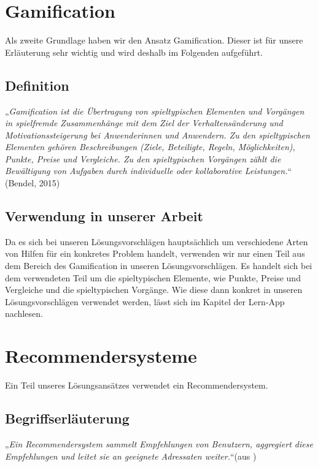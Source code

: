 \section{Gamification}
Als zweite Grundlage haben wir den Ansatz Gamification. Dieser ist für unsere Erläuterung sehr wichtig und wird deshalb im Folgenden aufgeführt.
\subsection{Definition}
„\textit{Gamification ist die Übertragung von spieltypischen Elementen und Vorgängen in spielfremde Zusammenhänge mit dem Ziel der Verhaltensänderung und Motivationssteigerung bei Anwenderinnen und Anwendern. Zu den spieltypischen Elementen gehören Beschreibungen (Ziele, Beteiligte, Regeln, Möglichkeiten), Punkte, Preise und Vergleiche. Zu den spieltypischen Vorgängen zählt die Bewältigung von Aufgaben durch individuelle oder kollaborative Leistungen.}“ (Bendel, 2015)

\subsection{Verwendung in unserer Arbeit}
Da es sich bei unseren Lösungsvorschlägen hauptsächlich um verschiedene Arten von Hilfen für ein konkretes Problem handelt, verwenden wir nur einen Teil aus dem Bereich des Gamification in unseren Lösungsvorschlägen. Es handelt sich bei dem verwendeten Teil um die spieltypischen Elemente, wie Punkte, Preise und Vergleiche und die spieltypischen Vorgänge. Wie diese dann konkret in unseren Lösungsvorschlägen verwendet werden, lässt sich im Kapitel der Lern-App nachlesen.

\section{Recommendersysteme}
Ein Teil unseres Lösungsansätzes verwendet ein Recommendersystem.
\subsection{Begriffserläuterung}
„\textit{Ein Recommendersystem sammelt Empfehlungen von Benutzern, aggregiert diese Empfehlungen und leitet sie an geeignete Adressaten weiter.}“(aus \cite{recommender})

